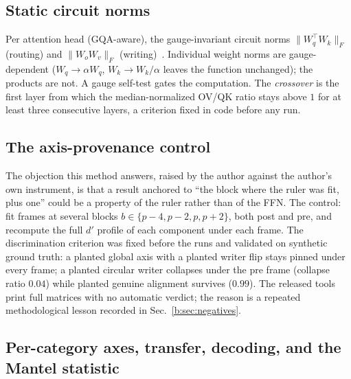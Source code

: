 \documentclass[11pt]{article}
\begin{document}
\subsection{Static circuit norms}
\label{b:sec:circuits}

Per attention head (GQA-aware), the gauge-invariant circuit norms
$\lVert W_q^{\top} W_k \rVert_F$ (routing) and $\lVert W_o W_v \rVert_F$
(writing)~\cite{elhage2021}. Individual weight norms are gauge-dependent
($W_q \to \alpha W_q$, $W_k \to W_k / \alpha$ leaves the function
unchanged); the products are not. A gauge self-test gates the computation.
The \emph{crossover} is the first layer from which the median-normalized
OV/QK ratio stays above $1$ for at least three consecutive layers, a
criterion fixed in code before any run.

\subsection{The axis-provenance control}
\label{b:sec:provenance}

The objection this method answers, raised by the author against the
author's own instrument, is that a result anchored to ``the block where the
ruler was fit, plus one'' could be a property of the ruler rather than of
the FFN. The control: fit frames at several blocks
$b \in \{p{-}4, p{-}2, p, p{+}2\}$, both post and pre, and recompute the
full $d'$ profile of each component under each frame. The discrimination
criterion was fixed before the runs and validated on synthetic ground
truth: a planted global axis with a planted writer flip stays pinned under
every frame; a planted circular writer collapses under the pre frame
(collapse ratio $0.04$) while planted genuine alignment survives ($0.99$).
The released tools print full matrices with no automatic verdict; the
reason is a repeated methodological lesson recorded in
Sec.~\ref{b:sec:negatives}.

\subsection{Per-category axes, transfer, decoding, and the Mantel statistic}
\label{b:sec:catmethods}
\end{document}
